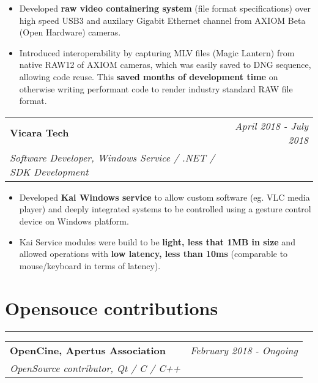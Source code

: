 \documentclass[9pt, a4paper]{article}
\begin{document}
\begin{itemize}
	\itemsep0em
	\item Developed \textbf{raw video containering system} (file format specifications) over high speed USB3 and auxilary Gigabit Ethernet channel from AXIOM Beta (Open Hardware) cameras.
	\item Introduced interoperability by capturing MLV files (Magic Lantern) from native RAW12 of AXIOM cameras, which was easily saved to DNG sequence, allowing code reuse. This \textbf{saved months of development time} on otherwise writing performant code to render industry standard RAW file format.
\end{itemize}

\vspace{4px}
\hspace{5px}
\begin{tabularx}{\textwidth}{X r}
	\textbf{Vicara Tech} & \textit{April 2018 - July 2018} \\
	\textit{\small Software Developer, Windows Service / .NET / SDK Development} & \\
\end{tabularx}

\begin{itemize}
	\itemsep0em
	\item Developed \textbf{Kai Windows service} to allow custom software (eg. VLC media player) and deeply integrated systems to be controlled using a gesture control device on Windows platform.
	\item Kai Service modules were build to be \textbf{light, less that 1MB in size} and allowed operations with \textbf{low latency, less than 10ms} (comparable to mouse/keyboard in terms of latency).
\end{itemize}

\section*{Opensouce contributions}
\vspace{-8px}
\hrule
\vspace{4px}
\hspace{5px}
\begin{tabularx}{\textwidth}{X r}
	\textbf{OpenCine, Apertus Association} & \textit{February 2018 - Ongoing	} \\
	\textit{\small OpenSource contributor, Qt / C / C++} & \\
\end{tabularx}
\end{document}
